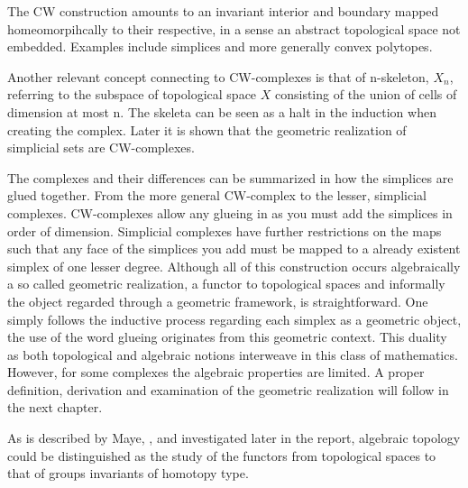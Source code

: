 \documentclass[../../main.tex]{subfiles}
\begin{document}
    The CW construction amounts to an invariant interior and boundary mapped homeomorpihcally to their respective, in a sense an abstract topological space not embedded. Examples include simplices and more generally convex polytopes.
    
    Another relevant concept connecting to CW-complexes is that of n-skeleton, $X_n$, referring to the subspace of topological space $X$ consisting of the union of cells of dimension at most n. The skeleta can be seen as a halt in the induction when creating the complex. Later it is shown that the geometric realization of simplicial sets are CW-complexes.

    The complexes and their differences can be summarized in how the simplices are glued together. From the more general CW-complex to the lesser, simplicial complexes. CW-complexes allow any glueing in as you must add the simplices in order of dimension. Simplicial complexes have further restrictions on the maps such that any face of the simplices you add must be mapped to a already existent simplex of one lesser degree. Although all of this construction occurs algebraically a so called geometric realization, a functor to topological spaces and informally the object regarded through a geometric framework, is straightforward. One simply follows the inductive process regarding each simplex as a geometric object, the use of the word glueing originates from this geometric context. This duality as both topological and algebraic notions interweave in this class of mathematics. However, for some complexes the algebraic properties are limited. A proper definition, derivation and examination of the geometric realization will follow in the next chapter.

    As is described by Maye, \cite{simp-may}, and investigated later in the report, algebraic topology could be distinguished as the study of the functors from topological spaces to that of groups invariants of homotopy type. 

    
\end{document}
